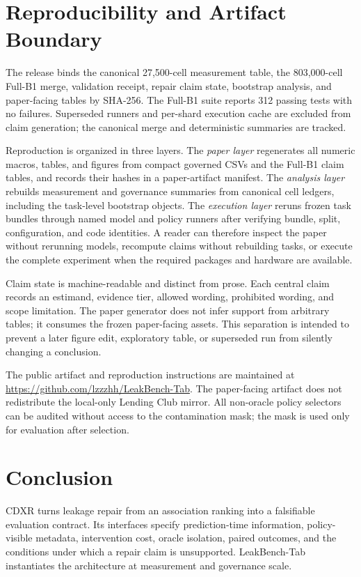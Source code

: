 \documentclass[sigconf,review]{acmart}
\begin{document}
\section{Reproducibility and Artifact Boundary}

The release binds the canonical 27,500-cell measurement table, the 803,000-cell
Full-B1 merge, validation receipt, repair claim state, bootstrap analysis, and
paper-facing tables by SHA-256. The Full-B1 suite reports 312 passing tests with
no failures. Superseded runners and per-shard execution cache are excluded from
claim generation; the canonical merge and deterministic summaries are tracked.

Reproduction is organized in three layers. The \emph{paper layer} regenerates
all numeric macros, tables, and figures from compact governed CSVs and the
Full-B1 claim tables, and records their hashes in a paper-artifact manifest.
The \emph{analysis layer}
rebuilds measurement and governance summaries from canonical cell ledgers,
including the task-level bootstrap objects. The \emph{execution layer} reruns
frozen task bundles through named model and policy runners after verifying
bundle, split, configuration, and code identities. A reader can therefore
inspect the paper without rerunning models, recompute claims without rebuilding
tasks, or execute the complete experiment when the required packages and
hardware are available.

Claim state is machine-readable and distinct from prose. Each central claim
records an estimand, evidence tier, allowed wording, prohibited wording, and
scope limitation. The paper generator does not infer support from arbitrary
tables; it consumes the frozen paper-facing assets. This separation is intended
to prevent a later figure edit, exploratory table, or superseded run from
silently changing a conclusion.

The public artifact and reproduction instructions are maintained at
\url{https://github.com/lzzzhh/LeakBench-Tab}. The paper-facing artifact does
not redistribute the local-only Lending Club mirror. All non-oracle policy
selectors can be audited without access to the contamination mask; the mask is
used only for evaluation after selection.

\section{Conclusion}

CDXR turns leakage repair from an association ranking into a falsifiable
evaluation contract. Its interfaces specify prediction-time information,
policy-visible metadata, intervention cost, oracle isolation, paired outcomes,
and the conditions under which a repair claim is unsupported. LeakBench-Tab
instantiates the architecture at measurement and governance scale.
\end{document}
